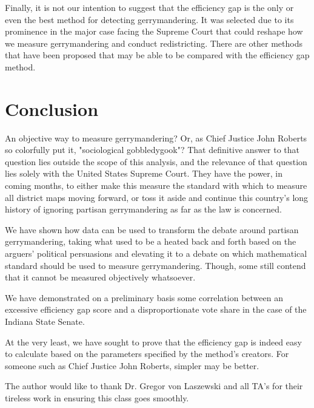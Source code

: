 \documentclass[sigconf]{acmart}
\begin{document}
Finally, it is not our intention to suggest that the efficiency gap is the only or even the best method for detecting gerrymandering. It was selected due to its prominence in the major case facing the Supreme Court that could reshape how we measure gerrymandering and conduct redistricting. There are other methods\cite{levin}\cite{warrington} that have been proposed that may be able to be compared with the efficiency gap method.

\section{Conclusion}
An objective way to measure gerrymandering? Or, as Chief Justice John Roberts so colorfully put it, "sociological gobbledygook"? That definitive answer to that question lies outside the scope of this analysis, and the relevance of that question lies solely with the United States Supreme Court. They have the power, in coming months, to either make this measure the standard with which to measure all district maps moving forward, or toss it aside and continue this country's long history of ignoring partisan gerrymandering as far as the law is concerned.

We have shown how data can be used to transform the debate around partisan gerrymandering, taking what used to be a heated back and forth based on the arguers' political persuasions and elevating it to a debate on which mathematical standard should be used to measure gerrymandering. Though, some still contend that it cannot be measured objectively whatsoever. 

We have demonstrated on a preliminary basis some correlation between an excessive efficiency gap score and a disproportionate vote share in the case of the Indiana State Senate.

At the very least, we have sought to prove that the efficiency gap is indeed easy to calculate based on the parameters specified by the method's creators. For someone such as Chief Justice John Roberts, simpler may be better.

\begin{acks}

  The author would like to thank Dr. Gregor von Laszewski and all TA's for their tireless work in ensuring this class goes smoothly.

\end{acks}


 

\appendix


\end{document}
